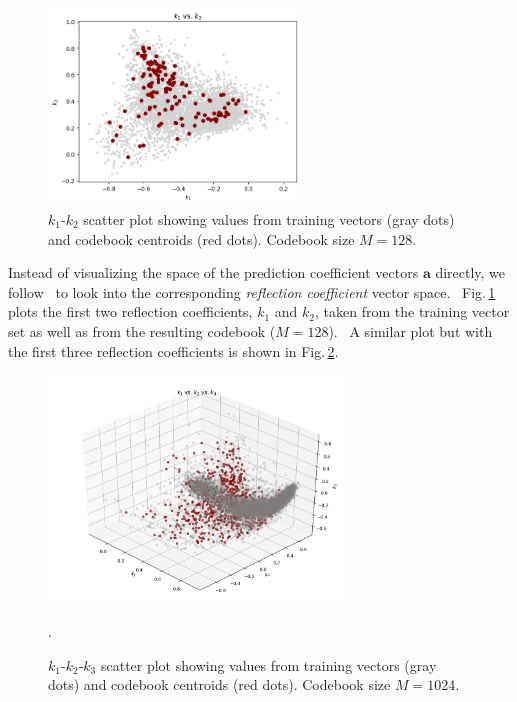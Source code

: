 \documentclass[letterpaper,12pt]{article}
\newcommand{\ba}{\ensuremath{\mathbf{a}}}
\begin{document}
    \begin{figure}[!ht]
        \centering
        \includegraphics[width=0.6\textwidth]{../HBSe_20170128T231621/cb_kk_training_8000_codebook_128.png}
        \caption{
        $k_1$-$k_2$ scatter plot showing values from training vectors (gray dots) and
        codebook centroids (red dots).
        Codebook size $M=128$.
        }
        \label{fig:cb_kk_training_8000_codebook_128}
    \end{figure}

    Instead of visualizing the space of the prediction coefficient vectors $\ba$
    directly, we follow~\citep{Juang-etal:82} to look into the
    corresponding \textit{reflection coefficient} vector space.
    \
    Fig.\,\ref{fig:cb_kk_training_8000_codebook_128}
    plots the first two reflection coefficients, $k_1$ and $k_2$,
    taken from the training vector set as well as from the resulting codebook ($M=128$).
    \
    A similar plot but with the first three reflection coefficients is shown
    in Fig.\,\ref{fig:cb_kkk_training_8000_codebook_1024}.
    \begin{figure}[!ht]
        \centering
        \includegraphics[width=0.7\textwidth]{../MARS_20161221_000046_SongSession_16kHz_HPF5Hz/cb_kkk_training_8000_codebook_1024.png}
        \caption{
        $k_1$-$k_2$-$k_3$ scatter plot showing values from training vectors (gray dots) and
        codebook centroids (red dots).
        Codebook size $M=1024$.
        }
        \label{fig:cb_kkk_training_8000_codebook_1024}.
    \end{figure}


    \clearpage
    
    
\end{document}
